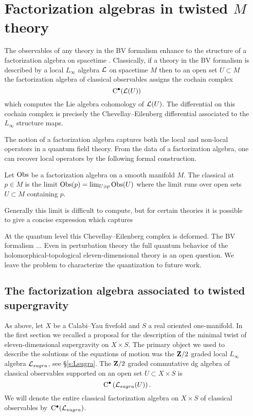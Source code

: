 \documentclass[11pt]{amsart}
\begin{document}
\section{Factorization algebras in twisted $M$ theory}

The observables of any theory in the BV formalism enhance to the structure of a factorization algebra on spacetime \cite{CG2}. 
Classically, if a theory in the BV formalism is described by a local $L_\infty$ algebra $\mathcal L$ on spacetime $M$ then to an open set $U \subset M$ the factorization algebra of classical observables assigns the cochain complex
\[
{\rm C}^\bullet(\mathcal L(U))
\]
which computes the Lie algebra cohomology of $\mathcal L(U)$. 
The differential on this cochain complex is precisely the Chevellay--Eilenberg differential associated to the $L_\infty$ structure maps. 

\begin{rmk}
The notion of a factorization algebra captures both the local and non-local operators in a quantum field theory. 
From the data of a factorization algebra, one can recover local operators by the following formal construction. 

Let $\operatorname{Obs}$ be a factorization algebra on a smooth manifold $M$.
The classical  at $p \in M$ is the limit $\operatorname{Obs}(p) = \lim_{U \ni p} \operatorname{Obs}(U)$ where the limit runs over open sets $U \subset M$ containing $p$.

Generally this limit is difficult to compute, but for certain theories it is possible to give a concise expression which captures 
\end{rmk}

At the quantum level this Chevellay--Eilenberg complex is deformed.
The BV formalism ...
Even in perturbation theory the full quantum behavior of the holomorphical-topological eleven-dimensional theory is an open question. 
We leave the problem to characterize the quantization to future work. 

\subsection{The factorization algebra associated to twisted supergravity}

\parsec[s:sugraobs]

As above, let $X$ be a Calabi--Yau fivefold and $S$ a real oriented one-manifold. 
In the first section we recalled a proposal for the description of the minimal twist of eleven-dimensional supergravity on $X \times S$. 
The primary object we used to describe the solutions of the equations of motion was the $\mathbf{Z}/2$ graded local $L_\infty$ algebra $\mathcal L_{sugra}$, see \S \ref{s:Lsugra}. 
The $\mathbf{Z}/2$ graded commutative dg algebra of classical observables supported on an open set $U \subset X \times S$ is 
\[
{\rm C}^\bullet\left(\mathcal L_{sugra}(U)\right) .
\]
We will denote the entire classical factorization algebra on $X \times S$ of classical observables by~${\rm C}^\bullet(\mathcal L_{sugra})$.
\end{document}

